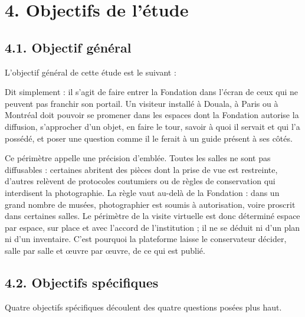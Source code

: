\section*{4. Objectifs de l'étude}

\subsection*{4.1. Objectif général}

L'objectif général de cette étude est le suivant :


Dit simplement : il s'agit de faire entrer la Fondation dans l'écran de ceux qui
ne peuvent pas franchir son portail. Un visiteur installé à Douala, à Paris ou à
Montréal doit pouvoir se promener dans les espaces dont la Fondation autorise la
diffusion, s'approcher d'un objet, en faire le tour, savoir à quoi il servait et
qui l'a possédé, et poser une question comme il le ferait à un guide présent à
ses côtés.

Ce périmètre appelle une précision d'emblée. Toutes les salles ne sont pas
diffusables : certaines abritent des pièces dont la prise de vue est restreinte,
d'autres relèvent de protocoles coutumiers ou de règles de conservation qui
interdisent la photographie. La règle vaut au-delà de la Fondation : dans un
grand nombre de musées, photographier est soumis à autorisation, voire proscrit
dans certaines salles. Le périmètre de la visite virtuelle est donc déterminé
espace par espace, sur place et avec l'accord de l'institution ; il ne se déduit
ni d'un plan ni d'un inventaire. C'est pourquoi la plateforme laisse le
conservateur décider, salle par salle et œuvre par œuvre, de ce qui est publié.

\subsection*{4.2. Objectifs spécifiques}

Quatre objectifs spécifiques découlent des quatre questions posées plus haut.

